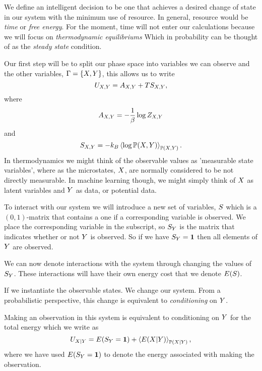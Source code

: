 \documentclass[]{article}
\begin{document}
We define an intelligent decision to be one that achieves a desired
change of state in our system with the minimum use of resource. In
general, resource would be \emph{time} or \emph{free energy}. For the
moment, time will not enter our calculations because we will focus on
\emph{thermodynamic equilibriums} Which in probability can be thought
of as the \emph{steady state} condition.

Our first step will be to split our phase space into variables we can
observe and the other variables, \(\Gamma =
\{X, Y\}\), this allows us to write
\[
U_{X,Y} =
A_{X,Y} +
TS_{X,Y},
\] 
where 
\[
A_{X,Y} = - \frac{1}{\beta}\log
Z_{X,Y}
\] 
and 
\[
S_{X,Y} = -k_B \left\langle \log
  \mathbb{P}({X,Y}) \right\rangle_{\mathbb{P}({X,Y})}.
\]
In thermodynamics we might think of the observable values as
'measurable state variables', where as the microstates,
$X$, are normally considered to be not directly
measurable. In machine learning though, we might simply think of
$X$ as latent variables and $Y$ as data, or
potential data.

To interact with our system we will introduce a new set of variables,
$S$ which is a $(0,1)$-matrix that contains a one if
a corresponding variable is observed. We place the corresponding
variable in the subscript, so $S_Y$ is
the matrix that indicates whether or not $Y$ is
observed. So if we have $S_Y =
\mathbf{1}$ then all elements of $Y$ are observed.

We can now denote interactions with the system through changing the
values of $S_Y$. These interactions will
have their own energy cost that we denote $E(S)$.

If we instantiate the observable states. We change our system. From a
probabilistic perspective, this change is equivalent to
\emph{conditioning} on \(Y\).

Making an observation in this system is equivalent to conditioning on
\(Y\) for the total energy which we write as 
\[
U_{X|Y} =
E(S_Y=\mathbf{1}) +
\left\langle E({X|Y}) \right\rangle_{\mathbb{P}({X|Y})},
\]
where we have used $E(S_Y=\mathbf{1})$
to denote the energy associated with making the observation.
\end{document}
